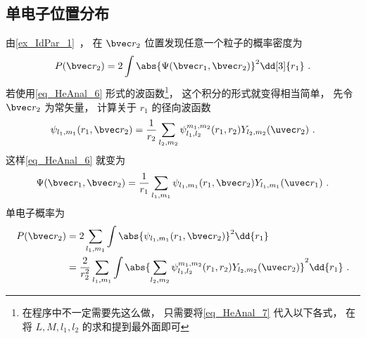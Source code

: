\subsection{单电子位置分布}
由\autoref{ex_IdPar_1}~， 在 $\bvec r_2$ 位置发现任意一个粒子的概率密度为
\begin{equation}\label{eq_HeAnal_24}
P(\bvec r_2) = 2\int \abs{\Psi(\bvec r_1, \bvec r_2)}^2 \dd[3]{r_1}~.
\end{equation}
若使用\autoref{eq_HeAnal_6} 形式的波函数\footnote{在程序中不一定需要先这么做， 只需要将\autoref{eq_HeAnal_7} 代入以下各式， 在将 $L, M, l_1, l_2$ 的求和提到最外面即可}， 这个积分的形式就变得相当简单， 先令 $\bvec r_2$ 为常矢量， 计算关于 $r_1$ 的径向波函数
\begin{equation}\label{eq_HeAnal_15}
\psi_{l_1, m_1}(r_1, \bvec r_2) = \frac{1}{r_2} \sum_{l_2, m_2} \psi_{l_1, l_2}^{m_1, m_2}(r_1, r_2) Y_{l_2, m_2}(\uvec r_2)~.
\end{equation}
这样\autoref{eq_HeAnal_6} 就变为
\begin{equation}
\Psi(\bvec r_1, \bvec r_2) = \frac{1}{r_1} \sum_{l_1, m_1} \psi_{l_1, m_1}(r_1, \bvec r_2) Y_{l_1, m_1} (\uvec r_1)~.
\end{equation}
单电子概率为
\begin{equation}\label{eq_HeAnal_25}
\begin{aligned}
P(\bvec r_2) &= 2\sum_{l_1, m_1} \int \abs{\psi_{l_1, m_1}(r_1, \bvec r_2)}^2 \dd{r_1}\\
& = \frac{2}{r_2^2} \sum_{l_1, m_1} \int \abs{\sum_{l_2, m_2} \psi_{l_1, l_2}^{m_1, m_2}(r_1, r_2) Y_{l_2,m_2}(\uvec r_2)}^2 \dd{r_1}~.
\end{aligned}
\end{equation}

